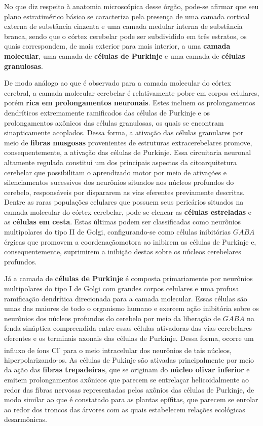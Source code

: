 \documentclass[
]{book}
\theoremstyle{definition}
\theoremstyle{definition}
\theoremstyle{definition}
\theoremstyle{definition}
\theoremstyle{remark}
\begin{document}
No que diz respeito à anatomia microscópica desse órgão, pode-se afirmar que seu plano estratimérico básico se caracteriza pela presença de uma camada cortical externa de substância cinzenta e uma camada medular interna de substância branca, sendo que o córtex cerebelar pode ser subdividido em três estratos, os quais correspondem, de mais exterior para mais interior, a uma \textbf{camada molecular}, uma camada de \textbf{células de Purkinje} e uma camada de \textbf{células granulosas}.

De modo análogo ao que é observado para a camada molecular do córtex cerebral, a camada molecular cerebelar é relativamente pobre em corpos celulares, porém \textbf{rica em prolongamentos neuronais}. Estes incluem os prolongamentos dendríticos extremamente ramificados das células de Purkinje e os prolongamentos axônicos das células granulosas, os quais se encontram sinapticamente acoplados. Dessa forma, a ativação das células granulares por meio de \textbf{fibras musgosas} provenientes de estruturas extracerebelares promove, consequentemente, a ativação das células de Purkinje. Essa circuitaria neuronal altamente regulada constitui um dos principais aspectos da citoarquitetura cerebelar que possibilitam o aprendizado motor por meio de ativações e silenciamentos sucessivos dos neurônios situados nos núcleos profundos do cerebelo, responsáveis por dispararem as vias eferentes previamente descritas. Dentre as raras populações celulares que possuem seus pericários situados na camada molecular do córtex cerebelar, pode-se elencar as \textbf{células estreladas} e as \textbf{células em cesta}. Estas últimas podem ser classificadas como neurônios multipolares do tipo II de Golgi, configurando-se como células inibitórias \(GABA\)érgicas que promovem a coordenaçãomotora ao inibirem as células de Purkinje e, consequentemente, suprimirem a inibição destas sobre os núcleos cerebelares profundos.

Já a camada de \textbf{células de Purkinje} é composta primariamente por neurônios multipolares do tipo I de Golgi com grandes corpos celulares e uma profusa ramificação dendrítica direcionada para a camada molecular. Essas células são umas das maiores de todo o organismo humano e exercem ação inibitória sobre os neurônios dos núcleos profundos do cerebelo por meio da liberação de \(GABA\) na fenda sináptica compreendida entre essas células ativadoras das vias cerebelares eferentes e os terminais axonais das células de Purkinje. Dessa forma, ocorre um influxo de íons Cl\textsuperscript{-} para o meio intracelular dos neurônios de tais núcleos, hiperpolarizando-os. As células de Pukinje são ativadas principalmente por meio da ação das \textbf{fibras trepadeiras}, que se originam do \textbf{núcleo olivar inferior} e emitem prolongamentos axônicos que parecem se entrelaçar helicoidalmente ao redor das fibras nervosas representadas pelos axônios das células de Purkinje, de modo similar ao que é constatado para as plantas epífitas, que parecem se enrolar ao redor dos troncos das árvores com as quais estabelecem relações ecológicas desarmônicas.
\end{document}
